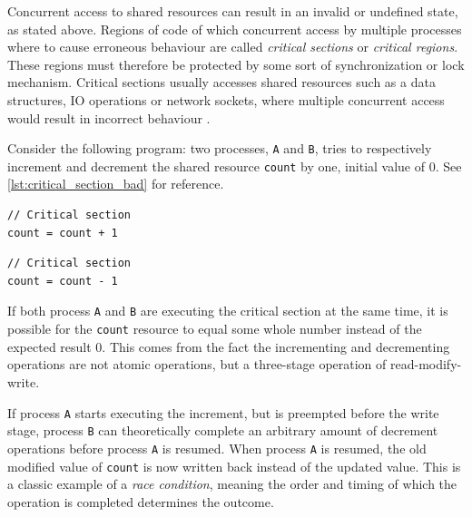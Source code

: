 Concurrent access to shared resources can result in an invalid or undefined state, as stated above. Regions of code of which concurrent access by multiple processes where to cause erroneous behaviour are called \textit{critical sections} or \textit{critical regions}. These regions must therefore be protected by some sort of synchronization or lock mechanism. Critical sections usually accesses shared resources such as a data structures, IO operations or network sockets, where multiple concurrent access would result in incorrect behaviour \citep{raynal2012concurrent}.

Consider the following program: two processes, \texttt{A} and \texttt{B}, tries to respectively increment and decrement the shared resource \texttt{count} by one, initial value of $0$. See \cref{lst:critical_section_bad} for reference.

\begin{lstfloat}
\noindent\begin{minipage}{0.45\textwidth}
\begin{lstlisting}[title={Process A},style={CustomC},frame={},xleftmargin={4em}]
// Critical section
count = count + 1
\end{lstlisting}
\end{minipage}
\begin{minipage}{0.45\textwidth}
\begin{lstlisting}[title={Process B},style={CustomC},frame={},xleftmargin={4em}]
// Critical section
count = count - 1
\end{lstlisting}
\end{minipage}
\label{lst:critical_section_bad}
\end{lstfloat}

If both process \texttt{A} and \texttt{B} are executing the critical section at the same time, it is possible for the \texttt{count} resource to equal some whole number instead of the expected result $0$. This comes from the fact the incrementing and decrementing operations are not atomic operations, but a three\hyp{}stage operation of read\hyp{}modify\hyp{}write. 

If process \texttt{A} starts executing the increment, but is preempted before the write stage, process \texttt{B} can theoretically complete an arbitrary amount of decrement operations before process \texttt{A} is resumed. When process \texttt{A} is resumed, the old modified value of \texttt{count} is now written back instead of the updated value. This is a classic example of a \textit{race condition}, meaning the order and timing of which the operation is completed determines the outcome.

